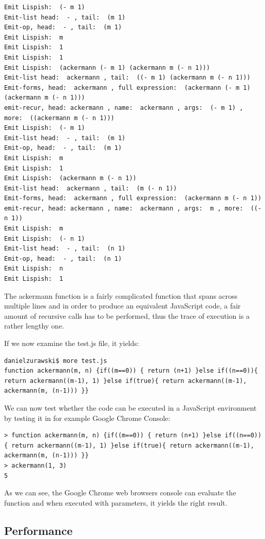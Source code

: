 \begin{verbatim}
Emit Lispish:  (- m 1)
Emit-list head:  - , tail:  (m 1)
Emit-op, head:  - , tail:  (m 1)
Emit Lispish:  m
Emit Lispish:  1
Emit Lispish:  1
Emit Lispish:  (ackermann (- m 1) (ackermann m (- n 1)))
Emit-list head:  ackermann , tail:  ((- m 1) (ackermann m (- n 1)))
Emit-forms, head:  ackermann , full expression:  (ackermann (- m 1) (ackermann m (- n 1)))
emit-recur, head: ackermann , name:  ackermann , args:  (- m 1) , more:  ((ackermann m (- n 1)))
Emit Lispish:  (- m 1)
Emit-list head:  - , tail:  (m 1)
Emit-op, head:  - , tail:  (m 1)
Emit Lispish:  m
Emit Lispish:  1
Emit Lispish:  (ackermann m (- n 1))
Emit-list head:  ackermann , tail:  (m (- n 1))
Emit-forms, head:  ackermann , full expression:  (ackermann m (- n 1))
emit-recur, head: ackermann , name:  ackermann , args:  m , more:  ((- n 1))
Emit Lispish:  m
Emit Lispish:  (- n 1)
Emit-list head:  - , tail:  (n 1)
Emit-op, head:  - , tail:  (n 1)
Emit Lispish:  n
Emit Lispish:  1
\end{verbatim}

The ackermann function is a fairly complicated function that spans across multiple lines and in order to produce an equivalent JavaScript code, a fair amount of recursive calls has to be performed, thus the trace of execution is a rather lengthy one. 

If we now examine the test.js file, it yields:

\begin{verbatim}
danielzurawski$ more test.js
function ackermann(m, n) {if((m==0)) { return (n+1) }else if((n==0)){ return ackermann((m-1), 1) }else if(true){ return ackermann((m-1), ackermann(m, (n-1))) }}
\end{verbatim}

We can now test whether the code can be executed in a JavaScript environment by testing it in for example Google Chrome Console: 

\begin{verbatim}
> function ackermann(m, n) {if((m==0)) { return (n+1) }else if((n==0)){ return ackermann((m-1), 1) }else if(true){ return ackermann((m-1), ackermann(m, (n-1))) }}
> ackermann(1, 3)
5
\end{verbatim}

As we can see, the Google Chrome web browsers console can evaluate the function and when executed with parameters, it yields the right result. 

\subsection{Performance}

